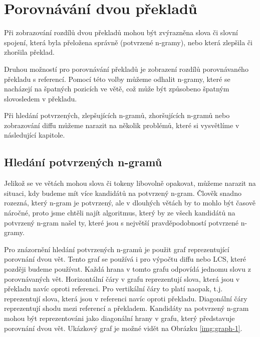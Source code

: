 \chapter{Porovnávání dvou překladů}
\label{chap:compare}

Při zobrazování rozdílů dvou překladů mohou být zvýrazněna slova či slovní spojení,
  která byla přeložena správně (potvrzené \mbox{n-gramy)},
  nebo která zlepšila či zhoršila překlad.

Druhou možností pro porovnávání překladů je zobrazení rozdílů porovnávaného překladu s referencí.
Pomocí této volby můžeme odhalit \mbox{n-gramy},
  které se nacházejí na špatných pozicích ve větě,
  což může být způsobeno špatným slovosledem v překladu.

Při hledání potvrzených, zlepšujících \mbox{n-gramů}, zhoršujících \mbox{n-gramů} nebo zobrazování diffu můžeme narazit na několik problémů,
  které si vysvětlíme v následující kapitole.

\section{Hledání potvrzených \mbox{n-gramů}}
Jelikož se ve větách mohou slova či tokeny libovolně opakovat,
  můžeme narazit na situaci,
  kdy budeme mít více kandidátů na potvrzený \mbox{n-gram}.
Člověk snadno rozezná,
  který \mbox{n-gram} je potvrzený,
  ale v dlouhých větách by to mohlo být časově náročné,
  proto jsme chtěli najít algoritmus,
  který by ze všech kandidátů na potvrzený \mbox{n-gram} našel ty,
  které jsou s největší pravděpodobností potvrzené \mbox{n-gramy}.

Pro znázornění hledání potvrzených \mbox{n-gramů} je použit graf reprezentující porovnání dvou vět.
Tento graf se používá i pro výpočtu diffu nebo LCS,
  které později budeme používat.
Každá hrana v tomto grafu odpovídá jednomu slovu z porovnávaných vět.
Horizontální čáry v grafu reprezentují slova, která jsou v překladu navíc oproti referenci. 
Pro vertikální čáry to platí naopak, t.j. reprezentují slova, která jsou v referenci navíc oproti překladu.
Diagonální čáry reprezentují shodu mezi referencí a překladem.
Kandidáty na potvrzený \mbox{n-gram} mohou být reprezentováni jako diagonální hrany v grafu,
  který představuje porovnání dvou vět.
Ukázkový graf je možné vidět na Obrázku \ref{img:graph-1}.

